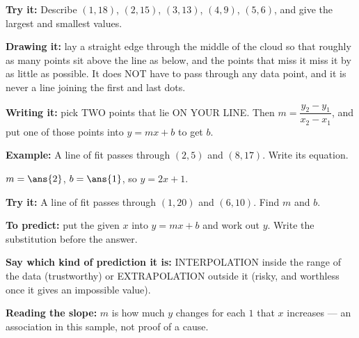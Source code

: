 \documentclass[12pt]{article}
\begin{document}
\begin{tryitbox}
\textbf{Try it:} \quad Describe $(1, 18)$, $(2, 15)$, $(3, 13)$, $(4, 9)$, $(5, 6)$, and give the largest and smallest values.\\[2pt]
\end{tryitbox}


\begin{formulabox}
\textbf{Drawing it:} lay a straight edge through the middle of the cloud so that roughly as many points sit above the line as below, and the points that miss it miss it by as little as possible. It does NOT have to pass through any data point, and it is never a line joining the first and last dots.\par
\textbf{Writing it:} pick TWO points that lie ON YOUR LINE. Then $m=\dfrac{y_{2}-y_{1}}{x_{2}-x_{1}}$, and put one of those points into $y = mx + b$ to get $b$.
\end{formulabox}

\begin{examplebox}
\textbf{Example:} \quad A line of fit passes through $(2, 5)$ and $(8, 17)$. Write its equation.

$m = \ans{2}$, \quad $b = \ans{1}$, \quad so $y = 2x + 1$.
\end{examplebox}

\begin{tryitbox}
\textbf{Try it:} \quad A line of fit passes through $(1, 20)$ and $(6, 10)$. Find $m$ and $b$.\\[2pt]
\end{tryitbox}


\begin{formulabox}
\textbf{To predict:} put the given $x$ into $y = mx + b$ and work out $y$. Write the substitution before the answer.\par
\textbf{Say which kind of prediction it is:} INTERPOLATION inside the range of the data (trustworthy) or EXTRAPOLATION outside it (risky, and worthless once it gives an impossible value).\par
\textbf{Reading the slope:} $m$ is how much $y$ changes for each $1$ that $x$ increases --- an association in this sample, not proof of a cause.
\end{formulabox}
\end{document}
